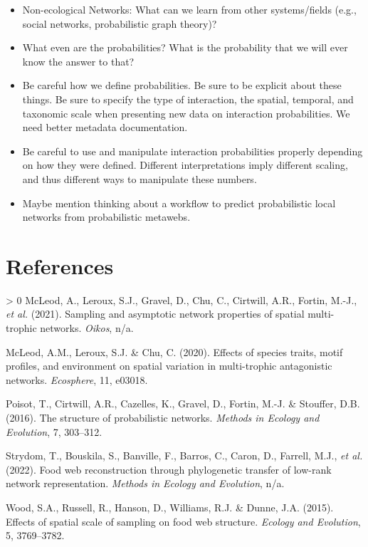 \documentclass[10pt,oneside]{article}
\newlength{\cslhangindent}
\newenvironment{CSLReferences}[3] %
 {%
  \setlength{\parindent}{0pt}
  \ifodd #1 \everypar{\setlength{\hangindent}{\cslhangindent}}\ignorespaces\fi
  \ifnum #2 > 0
  \setlength{\parskip}{#2\baselineskip}
  \fi
 }%
 {}
\begin{document}
\begin{itemize}
\tightlist
\item
  Non-ecological Networks: What can we learn from other systems/fields
  (e.g., social networks, probabilistic graph theory)?
\item
  What even are the probabilities? What is the probability that we will
  ever know the answer to that?
\item
  Be careful how we define probabilities. Be sure to be explicit about
  these things. Be sure to specify the type of interaction, the spatial,
  temporal, and taxonomic scale when presenting new data on interaction
  probabilities. We need better metadata documentation.
\item
  Be careful to use and manipulate interaction probabilities properly
  depending on how they were defined. Different interpretations imply
  different scaling, and thus different ways to manipulate these
  numbers.
\item
  Maybe mention thinking about a workflow to predict probabilistic local
  networks from probabilistic metawebs.
\end{itemize}

\hypertarget{references}{%
\section*{References}\label{references}}

\hypertarget{refs}{}
\begin{CSLReferences}{1}{0}
\leavevmode\hypertarget{ref-McLeod2021SamAsy}{}%
McLeod, A., Leroux, S.J., Gravel, D., Chu, C., Cirtwill, A.R., Fortin,
M.-J., \emph{et al.} (2021). Sampling and asymptotic network properties
of spatial multi-trophic networks. \emph{Oikos}, n/a.

\leavevmode\hypertarget{ref-McLeod2020EffSpe}{}%
McLeod, A.M., Leroux, S.J. \& Chu, C. (2020). Effects of species traits,
motif profiles, and environment on spatial variation in multi-trophic
antagonistic networks. \emph{Ecosphere}, 11, e03018.

\leavevmode\hypertarget{ref-Poisot2016StrProa}{}%
Poisot, T., Cirtwill, A.R., Cazelles, K., Gravel, D., Fortin, M.-J. \&
Stouffer, D.B. (2016). The structure of probabilistic networks.
\emph{Methods in Ecology and Evolution}, 7, 303--312.

\leavevmode\hypertarget{ref-Strydom2022FooWeb}{}%
Strydom, T., Bouskila, S., Banville, F., Barros, C., Caron, D., Farrell,
M.J., \emph{et al.} (2022). Food web reconstruction through phylogenetic
transfer of low-rank network representation. \emph{Methods in Ecology
and Evolution}, n/a.

\leavevmode\hypertarget{ref-Wood2015EffSpa}{}%
Wood, S.A., Russell, R., Hanson, D., Williams, R.J. \& Dunne, J.A.
(2015). Effects of spatial scale of sampling on food web structure.
\emph{Ecology and Evolution}, 5, 3769--3782.

\end{CSLReferences}
\end{document}
